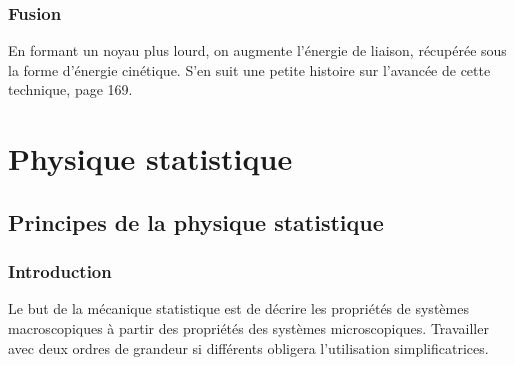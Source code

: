 \documentclass	[11pt, a4paper, openany]{book}
\begin{document}
\section{Fusion}
En formant un noyau plus lourd, on augmente l'énergie de liaison, récupérée sous la forme d'énergie
cinétique. S'en suit une petite histoire sur l'avancée de cette technique, page 169.



















\part{Physique statistique}
\setcounter{chapter}{12}
\chapter{Principes de la physique statistique}
\section{Introduction}
Le but de la mécanique statistique est de décrire les propriétés de systèmes macroscopiques à partir des 
propriétés des systèmes microscopiques. Travailler avec deux ordres de grandeur si différents obligera 
l'utilisation simplificatrices.
\end{document}
